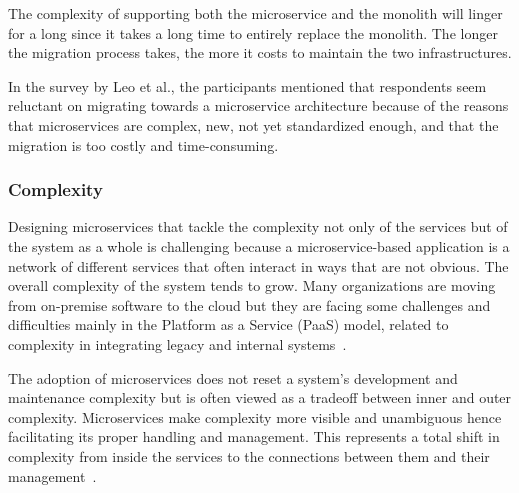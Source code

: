 The complexity of supporting both the microservice and the monolith will linger for a long since it takes a long time to entirely replace the monolith. The longer the migration process takes, the more it costs to maintain the two infrastructures\cite{Ndungu2019, Meshenberg2016, Michael2018}.

In the survey by Leo et al.,\cite{Leo2019} the participants mentioned that respondents seem reluctant on migrating towards a microservice architecture because of the reasons that microservices are complex, new, not yet standardized enough, and that the migration is too costly and time-consuming.



\subsubsection{Complexity}%

Designing microservices that tackle the complexity not only of the services but of the system as a whole is challenging because a microservice-based application is a network of different services that often interact in ways that are not obvious. The overall complexity of the system tends to grow. Many organizations are moving from on-premise software to the cloud but they are facing some challenges and difficulties mainly in the Platform as a Service (PaaS) model, related to complexity in integrating legacy and internal systems~\cite{rosa2018, Zaytev2018}.

The adoption of microservices does not reset a system's development and maintenance complexity but is often viewed as a tradeoff between inner and outer complexity. Microservices make complexity more visible and unambiguous hence facilitating its proper handling and management. This represents a total shift in complexity from inside the services to the connections between them and their management~\cite{Ndungu2019, gozneli2020}.

